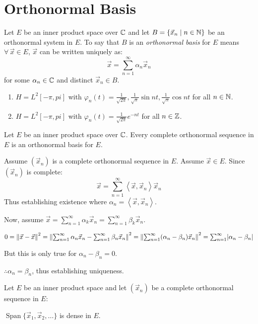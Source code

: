\documentclass[letterpaper,12pt,fleqn]{article}
\newcommand{\vx}{\vec{x}}
\renewcommand{\a}{\alpha}
\renewcommand{\b}{\beta}
\newcommand{\norm}[1]{\left\|#1\right\|}
\newcommand{\inner}[1]{\left<#1\right>}
\newcommand{\p}{\varphi}
\DeclareMathOperator{\spn}{Span}
\begin{document}
\section*{Orthonormal Basis}

\begin{definition}
  Let $E$ be an inner product space over $\mathbb{C}$ and let $B=\{\vx_n\mid n\in\N\}$
  be an orthonormal system in $E$. To say that $B$ is an
  \emph{orthonormal basis} for $E$ means $\forall\,\vx\in E$, $\vx$ can be
  written uniquely as:
  \[\vx=\sum_{n=1}^{\infty}\a_n\vx_n\]
  for some $\a_n\in\C$ and distinct $\vx_n\in B$.
\end{definition}

\begin{examples}
  \listbreak
  \begin{enumerate}
  \item $H=L^2[-\pi,pi]$ with $\p_n(t)=\frac{1}{\sqrt{2\pi}},
    \frac{1}{\sqrt{\pi}}\sin{nt},\frac{1}{\sqrt{\pi}}\cos{nt}$ for all
    $n\in\mathbb{N}$.

  \item $H=L^2[-\pi,pi]$ with $\p_n(t)=\frac{1}{\sqrt{2\pi}}e^{-nt}$ for all
    $n\in\mathbb{Z}$.
  \end{enumerate}
\end{examples}

\begin{theorem}
  Let $E$ be an inner product space over $\mathbb{C}$. Every complete orthonormal
  sequence in $E$ is an orthonormal basis for $E$.
\end{theorem}

\begin{theproof}
  Assume $(\vx_n)$ is a complete orthonormal sequence in $E$.
  Assume $\vx\in E$.
  Since $(\vx_n)$ is complete:
  \[\vx=\sum_{n=1}^{\infty}\inner{\vx,\vx_n}\vx_n\]
  Thus establishing existence where $\a_n=\inner{\vx,\vx_n}$.

  Now, assume $\vx=\sum_{n=1}^{\infty}\a_k\vx_n=\sum_{n=1}^{\infty}\b_k\vx_n$.

  $0=\norm{\vx-\vx}^2=
  \norm{\sum_{n=1}^{\infty}\a_n\vx_n-\sum_{n=1}^{\infty}\b_n\vx_n}^2=
  \norm{\sum_{n=1}^{\infty}(\a_n-\b_n)\vx_n}^2=\sum_{n=1}^{\infty}\abs{\a_n-\b_n}$

  But this is only true for $\a_n-\b_n=0$.

  $\therefore\a_n=\b_n$, thus establishing uniqueness.
\end{theproof}

\begin{corollary}
  Let $E$ be an inner product space and let $(\vx_n)$ be a complete orthonormal
  sequence in $E$:

  \qquad$\spn\{\vx_1,\vx_2,\ldots\}$ is dense in $E$.
\end{corollary}
\end{document}

